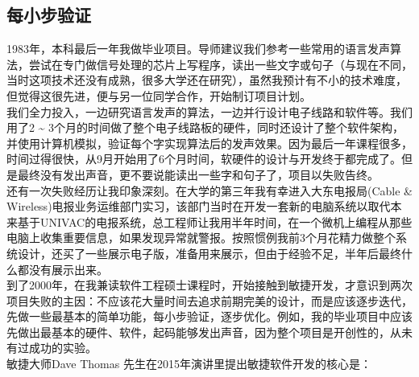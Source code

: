 \hypertarget{ux6bcfux5c0fux6b65ux9a8cux8bc1}{%
\subsection{每小步验证}\label{ux6bcfux5c0fux6b65ux9a8cux8bc1}}

1983年，本科最后一年我做毕业项目。导师建议我们参考一些常用的语言发声算法，尝试在专门做信号处理的芯片上写程序，读出一些文字或句子（与现在不同，当时这项技术还没有成熟，很多大学还在研究），虽然我预计有不小的技术难度，但觉得这很先进，便与另一位同学合作，开始制订项目计划。\\
我们全力投入，一边研究语言发声的算法，一边并行设计电子线路和软件等。我们用了2
\textasciitilde{}
3个月的时间做了整个电子线路板的硬件，同时还设计了整个软件架构，并使用计算机模拟，验证每个字实现算法后的发声效果。因为最后一年课程很多，时间过得很快，从9月开始用了6个月时间，软硬件的设计与开发终于都完成了。但是最终没有发出声音，更不要说能读出一些字和句子了，项目以失败告终。\\
还有一次失败经历让我印象深刻。在大学的第三年我有幸进入大东电报局(Cable
\&
Wireless)电报业务运维部门实习，该部门当时在开发一套新的电脑系统以取代本来基于UNIVAC的电报系统，总工程师让我用半年时间，在一个微机上编程从那些电脑上收集重要信息，如果发现异常就警报。按照惯例我前3个月花精力做整个系统设计，还买了一些展示电子版，准备用来展示，但由于经验不足，半年后最终什么都没有展示出来。\\
到了2000年，在我兼读软件工程硕士课程时，开始接触到敏捷开发，才意识到两次项目失败的主因：不应该花大量时间去追求前期完美的设计，而是应该逐步迭代，先做一些最基本的简单功能，每小步验证，逐步优化。例如，我的毕业项目中应该先做出最基本的硬件、软件，起码能够发出声音，因为整个项目是开创性的，从未有过成功的实验。\\
敏捷大师Dave Thomas 先生在2015年演讲里提出敏捷软件开发的核心是：


